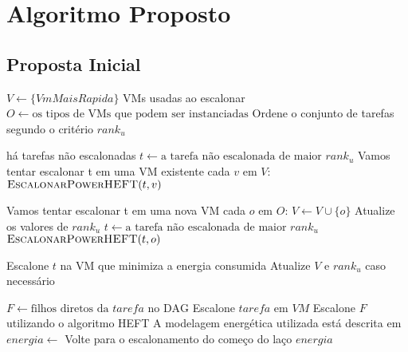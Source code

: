 \chapter{Algoritmo Proposto}
\label{cap:algoritmo}

\section{Proposta Inicial}

\begin{codebox}
	\li $V \gets \{VmMaisRapida\}$ \Comment VMs usadas ao escalonar
	\li $O \gets \text{os tipos de VMs que podem ser instanciadas}$
	\li Ordene o conjunto de tarefas segundo o critério $rank_u$
   
	\li \While há tarefas não escalonadas
		\li \Do $t \gets \text{a tarefa não escalonada de maior } rank_u$
		\zi
	    \li \Comment Vamos tentar escalonar t em uma VM existente
	    \li \For cada $v$ em $V$:
		    \li \Do	$\textnormal{\scshape EscalonarPowerHEFT}(t, v)$
	    \End
	    
	    \zi
	    \li \Comment Vamos tentar escalonar t em uma nova VM
	    \li \For cada $o$ em $O$:
		    \li \Do	$V \gets V \cup \{o\}$
		    \li Atualize os valores de $rank_u$
		    \li $t \gets \text{a tarefa não escalonada de maior } rank_u$
		    \li $\textnormal{\scshape EscalonarPowerHEFT}(t, o)$
	    \End
	    
	    \li Escalone $t$ na VM que minimiza a energia consumida
	    \li Atualize $V$ e $rank_u$ caso necessário
	\End
\End
\end{codebox}

\begin{codebox}
	\li $F \gets \text{filhos diretos da } tarefa \text{ no DAG}$
    \li Escalone $tarefa$ em $VM$
	\li Escalone $F$ utilizando o algoritmo \textsc{HEFT}
	\zi
	\li \Comment A modelagem energética utilizada está descrita em
    	\cite{guerout:energy_aware_simulation}
	\li $energia \gets$ 
		\li Volte para o escalonamento do começo do laço
	\li \Return $energia$
\end{codebox}